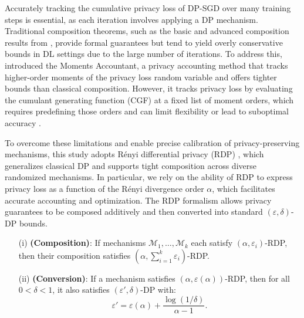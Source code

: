 Accurately tracking the cumulative privacy loss of DP-SGD over many training steps is essential, as each iteration involves applying a DP mechanism. Traditional composition theorems, such as the basic and advanced composition results from \citet{dwork2014algorithmic}, provide formal guarantees but tend to yield overly conservative bounds in DL settings due to the large number of iterations. To address this, \citet{abadi2016deep} introduced the Moments Accountant, a privacy accounting method that tracks higher-order moments of the privacy loss random variable and offers tighter bounds than classical composition. However, it tracks privacy loss by evaluating the cumulant generating function (CGF) at a fixed list of moment orders, which requires predefining those orders and can limit flexibility or lead to suboptimal accuracy \cite{wang2019subsampled}.

To overcome these limitations and enable precise calibration of privacy-preserving mechanisms, this study adopts Rényi differential privacy (RDP) \citep{mironov2017renyi}, which generalizes classical DP and supports tight composition across diverse randomized mechanisms. In particular, we rely on the ability of RDP to express privacy loss as a function of the Rényi divergence order $\alpha$, which facilitates accurate accounting and optimization. The RDP formalism allows privacy guarantees to be composed additively and then converted into standard $(\varepsilon, \delta)$-DP bounds.

\begin{theorem}\label{the:rdp_conversion}
\leavevmode
\begin{itemize}
    \item[(i)] \textbf{(Composition)}: If mechanisms $\mathcal{M}_1, \ldots, \mathcal{M}_k$ each satisfy $(\alpha, \varepsilon_i)$-RDP, then their composition satisfies $(\alpha, \sum_{i=1}^k \varepsilon_i)$-RDP.
    \item[(ii)] \textbf{(Conversion)}: If a mechanism satisfies $(\alpha, \varepsilon(\alpha))$-RDP, then for all $0 < \delta < 1$, it also satisfies $(\varepsilon', \delta)$-DP with:
    \[
    \varepsilon' = \varepsilon(\alpha) + \frac{\log(1/\delta)}{\alpha - 1}.
    \]
\end{itemize}
\end{theorem}

